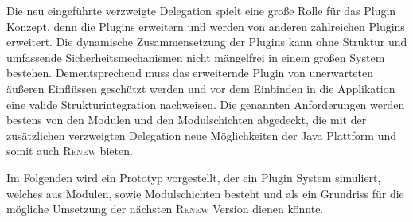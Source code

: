 	Die neu eingeführte verzweigte Delegation spielt eine große Rolle für das Plugin Konzept, denn die Plugins erweitern und werden von anderen zahlreichen Plugins erweitert. Die dynamische Zusammensetzung der Plugins kann ohne Struktur und umfassende Sicherheitsmechanismen nicht mängelfrei in einem großen System bestehen. Dementsprechend muss das erweiternde Plugin von unerwarteten äußeren Einflüssen geschützt werden und vor dem Einbinden in die Applikation eine valide Strukturintegration nachweisen. Die genannten Anforderungen werden bestens von den Modulen und den Modulschichten abgedeckt, die mit der zusätzlichen verzweigten Delegation neue Möglichkeiten der Java Plattform  und somit auch \textsc{Renew} bieten.\bigbreak

	Im Folgenden wird ein Prototyp vorgestellt, der ein Plugin System simuliert, welches aus Modulen, sowie  Modulschichten besteht und als ein Grundriss für die mögliche Umsetzung der nächsten \textsc{Renew} Version dienen könnte. \bigbreak
			
